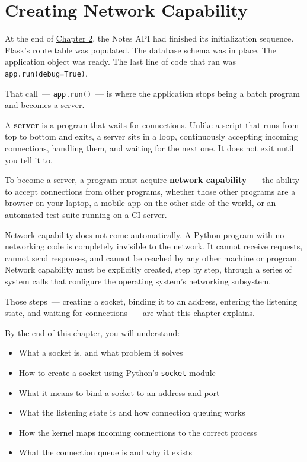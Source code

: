 \setcounter{chapter}{2}
\chapter{Creating Network Capability}\label{ch:03-network-capability}

\chapterrule

At the end of \hyperref[ch:02-runtime-initialization]{Chapter 2}, the Notes API had finished its initialization sequence. Flask's route table was populated. The database schema was in place. The application object was ready. The last line of code that ran was \texttt{app.run(debug=}\allowbreak{}\texttt{True)}.

That call~--- \texttt{app.run()}~--- is where the application stops being a batch program and becomes a server.

A \textbf{server} is a program that waits for connections. Unlike a script that runs from top to bottom and exits, a server sits in a loop, continuously accepting incoming connections, handling them, and waiting for the next one. It does not exit until you tell it to.

To become a server, a program must acquire \textbf{network capability}~--- the ability to accept connections from other programs, whether those other programs are a browser on your laptop, a mobile app on the other side of the world, or an automated test suite running on a CI server.

Network capability does not come automatically. A Python program with no networking code is completely invisible to the network. It cannot receive requests, cannot send responses, and cannot be reached by any other machine or program. Network capability must be explicitly created, step by step, through a series of system calls that configure the operating system's networking subsystem.

Those steps~--- creating a socket, binding it to an address, entering the listening state, and waiting for connections~--- are what this chapter explains.

\begin{objectives}

By the end of this chapter, you will understand:

\begin{itemize}
\tightlist
\item
  What a socket is, and what problem it solves
\item
  How to create a socket using Python's \texttt{socket} module
\item
  What it means to bind a socket to an address and port
\item
  What the listening state is and how connection queuing works
\item
  How the kernel maps incoming connections to the correct process
\item
  What the connection queue is and why it exists
\end{itemize}

\end{objectives}

